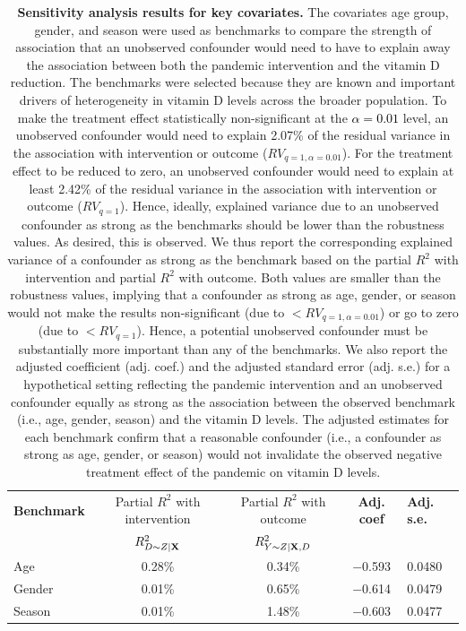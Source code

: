 \documentclass[12pt]{article}
\newcommand{\REV}[1]{\textcolor{black}{#1}}
\begin{document}
\begin{appendices}
\newpage

\begin{table}
    \centering
\caption[Sensitivity analysis results for key covariates]{\textbf{Sensitivity analysis results for key covariates.} The covariates age group, gender, and season were used as benchmarks to compare the strength of association that an unobserved confounder would need to have to explain away the association between both the pandemic intervention and the vitamin D reduction. The benchmarks were selected because they are known and important drivers of heterogeneity in vitamin D levels across the broader population. To make the treatment effect statistically non-significant at the \REV{$\alpha = 0.01$} level, an unobserved confounder would need to explain 2.07\% of the residual variance in the association with intervention or outcome ($RV_{q=1,\alpha=0.01}$). For the treatment effect to be reduced to zero, an unobserved confounder would need to explain at least 2.42\% of the residual variance in the association with intervention or outcome ($RV_{q=1}$). Hence, ideally, explained variance due to an unobserved confounder as strong as the benchmarks should be lower than the robustness values. As desired, this is observed. We thus report the corresponding explained variance of a confounder as strong as the benchmark based on the partial $R^2$ with intervention and partial $R^2$ with outcome. Both values are smaller than the robustness values, implying that a confounder as strong as age, gender, or season would not make the results non-significant (due to $< RV_{q=1,\alpha=0.01}$) or go to zero (due to $< RV_{q=1}$). Hence, a potential unobserved confounder must be substantially more important than any of the benchmarks. We also report the adjusted coefficient (adj. coef.) and the adjusted standard error (adj. s.e.) for a hypothetical setting reflecting the pandemic intervention and an unobserved confounder equally as strong as the association between the observed benchmark (i.e., age, gender, season) and the vitamin D levels. The adjusted estimates for each benchmark confirm that a reasonable confounder (i.e., a confounder as strong as age, gender, or season) would not invalidate the observed negative treatment effect of the pandemic on vitamin D levels. }
\label{supptab:sensitivity}
\footnotesize
    \begin{tabular}{|l|c|c|c|l|}
    \hline
    \rowcolor{orange!20} \textbf{Benchmark}& Partial $R^2$ with intervention & Partial $R^2$ with outcome & \textbf{Adj. coef} &\textbf{Adj. s.e.}\\ 
    \rowcolor{orange!20}  & \textbf{$R^2_{D\sim Z| {\bf X} }$} & \textbf{$R^2_{Y\sim Z| {\bf X}, D}$} & & \\
    \hline 
 Age& 0.28\%	& 0.34\%	&$-$0.593&0.0480\\ \hline 
 Gender& 0.01\%	& 0.65\%&$-$0.614&0.0479\\ \hline 
 Season& 0.01\%	& 1.48\%&$-$0.603	&0.0477\\\hline
\end{tabular}
\end{table}


\end{appendices}
\end{document}
